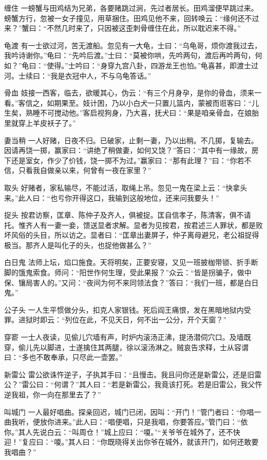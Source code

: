 \documentclass[12pt,UTF8]{ctexbook}
\begin{document}
缠住
一螃蟹与田鸡结为兄弟，各要赌跳过涧，先过者居长。田鸡溜便早跳过来。螃蟹方行，忽被一女子撞见，用草捆住。田鸡见他不来，回转唤云：“缘何还不过来？”蟹曰：“不然几时来了，只因被这歪刺骨缠住在此，所以耽迟来不得。”

龟渡
有一士欲过河，苦无渡船。忽见有一大龟，士曰：“乌龟哥，烦你渡我过去，我吟诗谢你。”龟曰：“先吟后渡。”士曰：“莫被你哄，先吟两句，渡后再吟两句，何如？”龟曰：“使得。”士吟曰：“身穿九宫八卦，四游龙王也怕。”龟喜甚，即渡士过河。士续曰：“我是衣冠中人，不与乌龟答话。”

骨血
妓接一西客，临去，欲暖其心，伪云：“有三个月身孕，是你的骨血，须来一看。”客信之，如期果至。妓计困，乃以小白犬一只置儿篮内，蒙被而诳客曰：“儿生矣，熟睡不可搅动他。”客启视狗身，乃大喜，抚犬曰：“果是咱亲骨血，在娘胎里就穿上羊皮袄子了。”

妻当稍
一人好赌，日夜不归。已破家，止剩一妻，乃以出稍。不几掷，复输去。因请再饶一掷，赢家曰：“讲绝了稍做妻，如何又饶？”答曰：“其中有一缘故，房下还是室女，作少了价钱，饶一掷不为过。”赢家曰：“那有此理？”曰：“你若不信，只看我自做亲以来，何曾有一夜在家里？”

取头
好赌者，家私输尽，不能过活，取绳上吊。忽见一鬼在梁上云：“快拿头来。”此人曰：“也亏你开得这口，我输到这般地位，还来问我要头！”

捉头
按君访察，匡章、陈仲子及齐人，俱被捉。匡自信孝子，陈清客，俱不请托。惟齐人有一妻一妾，馈送显者求解。显者为见按君，按君述三人罪状，都是败坏风俗的头目，所以访之。显者曰：“匡章出妻屏子，仲子离母避兄，老公祖捉得极当。那齐人是叫化子的头，也捉他做甚么？”

白日鬼
法师上坛，焰口施食。天将明矣，正要安寝，又见一班披枷带锁、折手断脚的饿鬼索食。师问：“阳世作何生理，受此果报？”众云：“皆是拐骗子，做中保、镶局害人的。”又问：“夜间为何不来同领法食？”答曰：“我们一班，都是白日鬼。”

公子头
一人生平惯做分头，扣克人家银钱。死后阎王痛恨，发在黑暗地狱内受罪。进狱时即云：“列位在此，不见天日，何不出一公分，开个天窗？”

穿窬
一士人夜读，见偷儿穴墙有声，时炉内滚汤正沸，提汤潜伺穴口。及墙既穿，偷儿先以脚进，士遂擒住其两腿，徐以滚汤淋之。贼哀告求释，士从容谓曰：“多也不敢奉承，只尽此一壶罢。”

新雷公
雷公欲诛忤逆子，子执其手曰：“且慢击。我且问你还是新雷公，还是旧雷公？”雷公曰：“何谓？”其人曰：“若是新雷公，我竟该打死。若是旧雷公，我父忤逆我祖，你一向在那里去了？”

叫城门
一人最好唱曲。探亲回迟，城门已闭，因叫：“开门！”管门者曰：“你唱一曲我听，便放你进来。”此人曰：“唱便唱，只是我唱，你要答应。”管门曰：“依你。”其人先说白云：“叫周仓！”城上应曰：“嗄。”“关爷爷在城外了，还不快迎！”复应曰：“嗄。”其人曰：“你既晓得关出你爷在城外，就该开门，如何还敢要我唱曲？”
\end{document}
